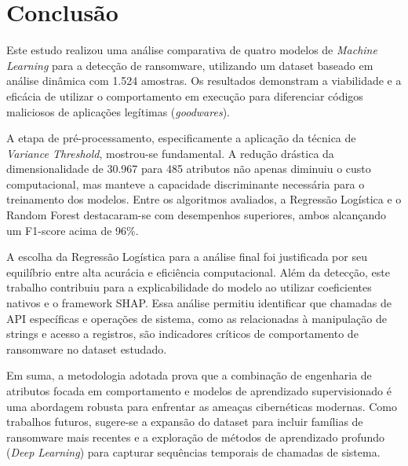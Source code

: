 
\section{Conclusão} \label{sec:conclu}

Este estudo realizou uma análise comparativa de quatro modelos de \textit{Machine Learning} para a detecção de ransomware, utilizando um dataset baseado em análise dinâmica com 1.524 amostras. Os resultados demonstram a viabilidade e a eficácia de utilizar o comportamento em execução para diferenciar códigos maliciosos de aplicações legítimas (\textit{goodwares}).

A etapa de pré-processamento, especificamente a aplicação da técnica de \textit{Variance Threshold}, mostrou-se fundamental. A redução drástica da dimensionalidade de 30.967 para 485 atributos não apenas diminuiu o custo computacional, mas manteve a capacidade discriminante necessária para o treinamento dos modelos. Entre os algoritmos avaliados, a Regressão Logística e o Random Forest destacaram-se com desempenhos superiores, ambos alcançando um F1-score acima de 96\%.

A escolha da Regressão Logística para a análise final foi justificada por seu equilíbrio entre alta acurácia e eficiência computacional. Além da detecção, este trabalho contribuiu para a explicabilidade do modelo ao utilizar coeficientes nativos e o framework SHAP. Essa análise permitiu identificar que chamadas de API específicas e operações de sistema, como as relacionadas à manipulação de strings e acesso a registros, são indicadores críticos de comportamento de ransomware no dataset estudado.

Em suma, a metodologia adotada prova que a combinação de engenharia de atributos focada em comportamento e modelos de aprendizado supervisionado é uma abordagem robusta para enfrentar as ameaças cibernéticas modernas. Como trabalhos futuros, sugere-se a expansão do dataset para incluir famílias de ransomware mais recentes e a exploração de métodos de aprendizado profundo (\textit{Deep Learning}) para capturar sequências temporais de chamadas de sistema.